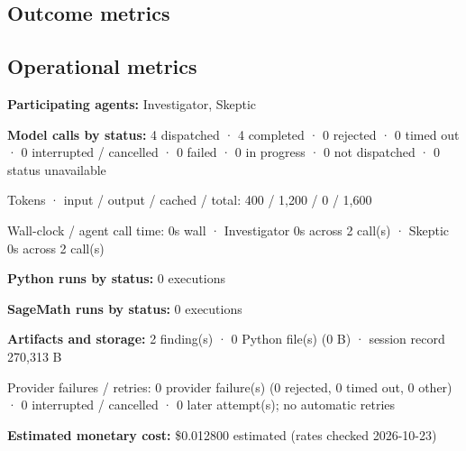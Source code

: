 \documentclass[11pt]{article}
\begin{document}
\subsection{Outcome metrics}
\subsection{Operational metrics}
\textbf{Participating agents:} Investigator, Skeptic\par
\textbf{Model calls by status:} 4 dispatched · 4 completed · 0 rejected · 0 timed out · 0 interrupted / cancelled · 0 failed · 0 in progress · 0 not dispatched · 0 status unavailable\par
Tokens · input / output / cached / total: 400 / 1,200 / 0 / 1,600\par
Wall-clock / agent call time: 0s wall · Investigator 0s across 2 call(s) · Skeptic 0s across 2 call(s)\par
\textbf{Python runs by status:} 0 executions\par
\textbf{SageMath runs by status:} 0 executions\par
\textbf{Artifacts and storage:} 2 finding(s) · 0 Python file(s) (0 B) · session record 270,313 B\par
Provider failures / retries: 0 provider failure(s) (0 rejected, 0 timed out, 0 other) · 0 interrupted / cancelled · 0 later attempt(s); no automatic retries\par
\textbf{Estimated monetary cost:} \$0.012800 estimated (rates checked 2026-10-23)\par
\end{document}
